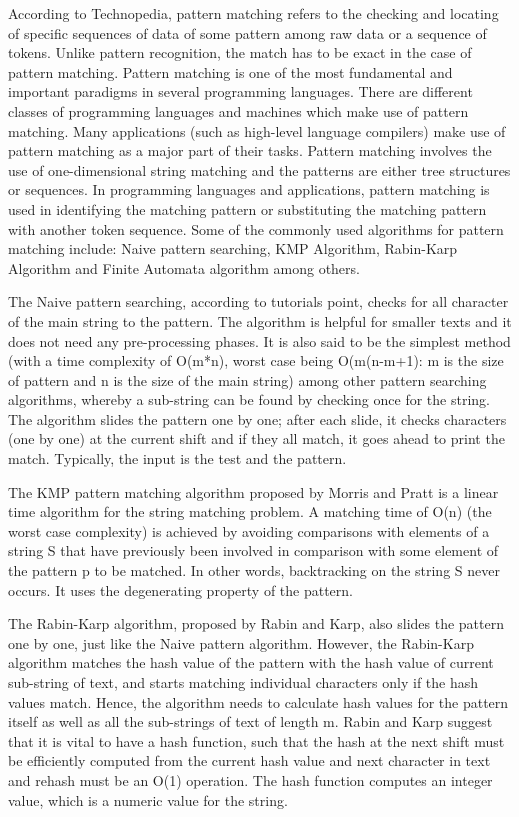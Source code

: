 \documentclass[a4paper]{article}
\begin{document}
According to Technopedia, pattern matching refers to the checking and locating of specific sequences of data of some pattern among raw data or a sequence of tokens. Unlike pattern recognition, the match has to be exact in the case of pattern matching. Pattern matching is one of the most fundamental and important paradigms in several programming languages. There are different classes of programming languages and machines which make use of pattern matching. Many applications (such as high-level language compilers) make use of pattern matching as a major part of their tasks. Pattern matching involves the use of one-dimensional string matching and the patterns are either tree structures or sequences.  In programming languages and applications, pattern matching is used in identifying the matching pattern or substituting the matching pattern with another token sequence. Some of the commonly used algorithms for pattern matching include: Naive pattern searching, KMP Algorithm, Rabin-Karp Algorithm and Finite Automata algorithm among others.

The Naive pattern searching, according to tutorials point, checks for all character of the main string to the pattern. The algorithm is helpful for smaller texts and it does not need any pre-processing phases. It is also said to be the simplest method (with a time complexity of O(m*n), worst case being O(m(n-m+1): m is the size of pattern and n is the size of the main string) among other pattern searching algorithms, whereby a sub-string can be found by checking once for the string. The algorithm slides the pattern one by one; after each slide, it checks characters (one by one) at the current shift and if they all match, it goes ahead to print the match. Typically, the input is the test and the pattern.

The KMP pattern matching algorithm proposed by Morris and Pratt is a linear time algorithm for the string matching problem. A matching time of O(n) (the worst case complexity) is achieved by avoiding comparisons with elements of a string S that have previously been involved in comparison with some element of the pattern p to be matched. In other words, backtracking on the string S never occurs. It uses the degenerating property of the pattern.

The Rabin-Karp algorithm, proposed by Rabin and Karp, also slides the pattern one by one, just like the Naive pattern algorithm. However, the Rabin-Karp algorithm matches the hash value of the pattern with the hash value of current sub-string of text, and starts matching individual characters only if the hash values match. Hence, the algorithm needs to calculate hash values for the pattern itself as well as all the sub-strings of text of length m. Rabin and Karp suggest that it is vital to have a hash function, such that the hash at the next shift must be efficiently computed from the current hash value and next character in text and rehash must be an O(1) operation. The hash function computes an integer value, which is a numeric value for the string.
\end{document}
